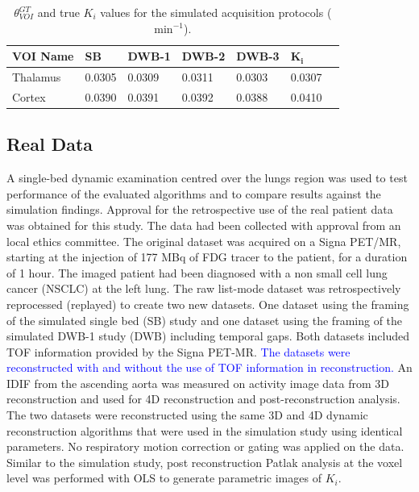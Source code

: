 \begin{table}[h!]
\centering
\caption{\label{tab:GTvalues}$\theta_{VOI}^{GT}$ and true $K_i$ values for the simulated acquisition protocols ($\mathrm{min}^{-1}$).}
\begin{tabular}{lllllll}
\toprule
\textbf{VOI Name} & \textbf{SB} & \textbf{DWB-1} & \textbf{DWB-2} & \textbf{DWB-3} & {$\boldsymbol{K_i}$} \\
\midrule
Thalamus   & 0.0305 & 0.0309 & 0.0311 & 0.0303 & 0.0307\\
Cortex     & 0.0390 & 0.0391 & 0.0392 & 0.0388 & 0.0410\\
\toprule
\end{tabular}

\end{table}

\subsection*{Real Data}
A single-bed dynamic examination centred over the lungs region was used to test performance of the evaluated algorithms and to compare results against the simulation findings. Approval for the retrospective use of the real patient data  was obtained for this study. The data had been collected with approval from an local ethics committee.
The original dataset was acquired on a Signa PET/MR, starting at the injection of 177 MBq of FDG tracer to the patient, for a duration of 1 hour. The imaged patient had been diagnosed with a non small cell lung cancer (NSCLC) at the left lung. 
The raw list-mode dataset was retrospectively reprocessed (replayed) to create two new datasets. One dataset using the framing of the simulated single bed (SB) study and one dataset using the framing of the simulated DWB-1 study (DWB) including temporal gaps.
Both datasets included TOF information provided by the Signa PET-MR. %
\textcolor{blue}{The datasets were reconstructed with and without the use of TOF information in reconstruction.}
An IDIF from the ascending aorta was measured on activity image data from 3D reconstruction and used for 4D reconstruction and post-reconstruction analysis. The two datasets were reconstructed using the same 3D and 4D dynamic reconstruction algorithms that were used in the simulation study using identical parameters. No respiratory motion correction or gating was applied on the data.
Similar to the simulation study, post reconstruction Patlak analysis at the voxel level was performed with OLS to generate parametric images of $K_i$.
